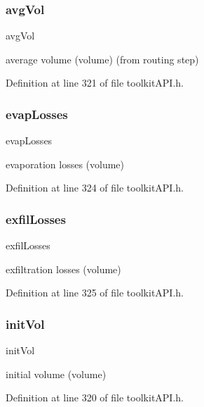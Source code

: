 \subsubsection{\texorpdfstring{avgVol}{avgVol}}
{\footnotesize\ttfamily avg\+Vol}

average volume (volume) (from routing step) 

Definition at line 321 of file toolkit\+A\+P\+I.\+h.

\mbox{\label{struct_s_m___storage_stats_a26f9ddf7a3fa4cc0e243386380eec7a4}} 
\subsubsection{\texorpdfstring{evapLosses}{evapLosses}}
{\footnotesize\ttfamily evap\+Losses}

evaporation losses (volume) 

Definition at line 324 of file toolkit\+A\+P\+I.\+h.

\mbox{\label{struct_s_m___storage_stats_adcd5d7e08a26246b15048680595f4581}} 
\subsubsection{\texorpdfstring{exfilLosses}{exfilLosses}}
{\footnotesize\ttfamily exfil\+Losses}

exfiltration losses (volume) 

Definition at line 325 of file toolkit\+A\+P\+I.\+h.

\mbox{\label{struct_s_m___storage_stats_acdb84b3495ce673cdb2a0ce99c95484d}} 
\subsubsection{\texorpdfstring{initVol}{initVol}}
{\footnotesize\ttfamily init\+Vol}

initial volume (volume) 

Definition at line 320 of file toolkit\+A\+P\+I.\+h.

